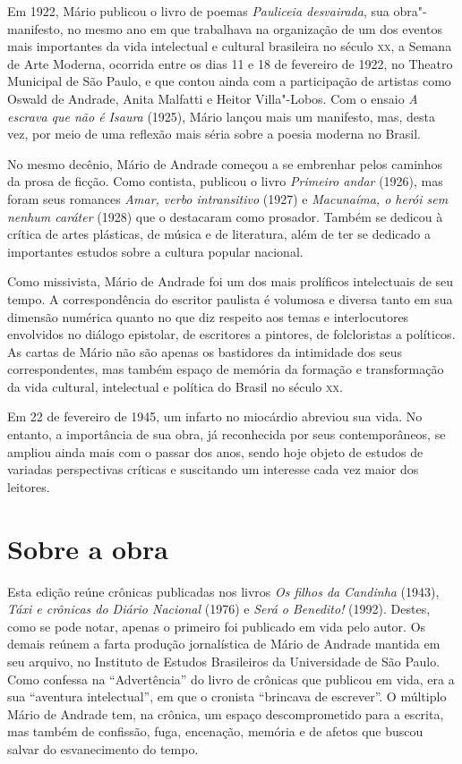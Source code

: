 Em 1922, Mário publicou o livro de poemas \emph{Pauliceia desvairada},
sua obra"-manifesto, no mesmo ano em que trabalhava na organização de um
dos eventos mais importantes da vida intelectual e cultural brasileira
no século \textsc{xx}, a Semana de Arte Moderna, ocorrida entre os dias 11 e 18
de fevereiro de 1922, no Theatro Municipal de São Paulo, e que contou
ainda com a participação de artistas como Oswald de Andrade, Anita
Malfatti e Heitor Villa"-Lobos. Com o ensaio \emph{A escrava que não é
Isaura} (1925), Mário lançou mais um manifesto, mas, desta vez, por meio
de uma reflexão mais séria sobre a poesia moderna no Brasil.

No mesmo decênio, Mário de Andrade começou a se embrenhar pelos caminhos
da prosa de ficção. Como contista, publicou o livro \emph{Primeiro
andar} (1926), mas foram seus romances \emph{Amar, verbo intransitivo}
(1927) e \emph{Macunaíma, o herói sem nenhum caráter} (1928) que o
destacaram como prosador. Também se dedicou à crítica de artes
plásticas, de música e de literatura, além de ter se dedicado a
importantes estudos sobre a cultura popular nacional.

Como missivista, Mário de Andrade foi um dos mais prolíficos
intelectuais de seu tempo. A correspondência do escritor paulista é
volumosa e diversa tanto em sua dimensão numérica quanto no que diz
respeito aos temas e interlocutores envolvidos no diálogo epistolar, de
escritores a pintores, de folcloristas a políticos. As cartas de Mário
não são apenas os bastidores da intimidade dos seus correspondentes, mas
também espaço de memória da formação e transformação da vida cultural,
intelectual e política do Brasil no século \textsc{xx}.

Em 22 de fevereiro de 1945, um infarto no miocárdio abreviou sua vida.
No entanto, a importância de sua obra, já reconhecida por seus
contemporâneos, se ampliou ainda mais com o passar dos anos, sendo hoje
objeto de estudos de variadas perspectivas críticas e suscitando um
interesse cada vez maior dos leitores.

\section{Sobre a obra}

Esta edição reúne crônicas publicadas nos livros \emph{Os filhos da
Candinha} (1943), \emph{Táxi e crônicas do Diário Nacional} (1976) e
\emph{Será o Benedito!} (1992). Destes, como se pode notar, apenas o
primeiro foi publicado em vida pelo autor. Os demais reúnem a farta
produção jornalística de Mário de Andrade mantida em seu arquivo, no
Instituto de Estudos Brasileiros da Universidade de São Paulo. Como
confessa na ``Advertência'' do livro de crônicas que publicou em vida,
era a sua ``aventura intelectual'', em que o cronista ``brincava de
escrever''. O múltiplo Mário de Andrade tem, na crônica, um espaço
descomprometido para a escrita, mas também de confissão, fuga,
encenação, memória e de afetos que buscou salvar do esvanecimento do
tempo.

